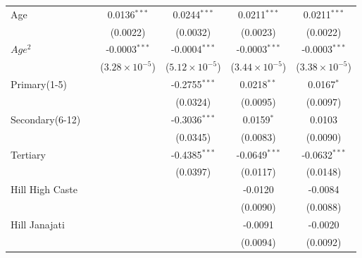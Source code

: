 \begin{tabular}{lccccc}
   Age                                         &                & 0.0136$^{***}$          & 0.0244$^{***}$          & 0.0211$^{***}$          & 0.0211$^{***}$\\   
                                               &                & (0.0022)                & (0.0032)                & (0.0023)                & (0.0022)\\   
   $Age^2$                                &                & -0.0003$^{***}$         & -0.0004$^{***}$         & -0.0003$^{***}$         & -0.0003$^{***}$\\   
                                               &                & ($3.28\times 10^{-5}$)  & ($5.12\times 10^{-5}$)  & ($3.44\times 10^{-5}$)  & ($3.38\times 10^{-5}$)\\    
   Primary(1-5)     &                &                         & -0.2755$^{***}$         & 0.0218$^{**}$           & 0.0167$^{*}$\\   
                                               &                &                         & (0.0324)                & (0.0095)                & (0.0097)\\   
   Secondary(6-12)  &                &                         & -0.3036$^{***}$         & 0.0159$^{*}$            & 0.0103\\   
                                               &                &                         & (0.0345)                & (0.0083)                & (0.0090)\\   
   Tertiary         &                &                         & -0.4385$^{***}$         & -0.0649$^{***}$         & -0.0632$^{***}$\\   
                                               &                &                         & (0.0397)                & (0.0117)                & (0.0148)\\   
   Hill High Caste              &                &                         &                         & -0.0120                 & -0.0084\\   
                                               &                &                         &                         & (0.0090)                & (0.0088)\\   
   Hill Janajati               &                &                         &                         & -0.0091                 & -0.0020\\   
                                               &                &                         &                         & (0.0094)                & (0.0092)\\   

\end{tabular}
